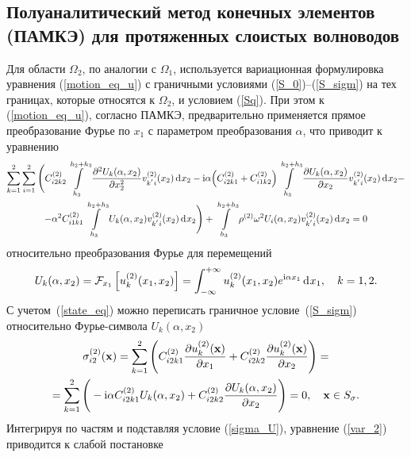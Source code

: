 \documentclass[press]{vestnik}
\begin{document}
	\subsection{Полуаналитический метод конечных элементов (ПАМКЭ) для протяженных слоистых волноводов} \label{SAFE}
Для области $\Omega_{2}$, по аналогии с $\Omega_{1}$, используется вариационная формулировка уравнения (\ref{motion_eq_u}) с граничными условиями (\ref{S_0})–(\ref{S_sigm}) на тех границах, которые относятся к $\Omega_{2}$, и условием (\ref{Sq}). При этом к (\ref{motion_eq_u}), согласно ПАМКЭ, предварительно применяется прямое преобразование Фурье по $x_{1}$ с параметром преобразования $\alpha$, что приводит к уравнению
\begin{multline}\label{var_2}
	\sum_{k=1}^{2} \sum_{i=1}^{2} 
	\Bigg(
	C_{i2k2}^{(2)} \int\limits_{h_{3}}^{h_{2}+h_{3}} \frac{\partial^{2} U_{k}(\alpha,x_{2}) }{\partial x_{2}^{2} } v_{k^{'}i}^{(2)}(x_{2}) \d x_{2} -
	 {\rm{i}} \alpha \Big( C_{i2k1}^{(2)} +C_{i1k2}^{(2)} \Big) \int\limits_{h_{3}}^{h_{2}+h_{3}} \frac{\partial U_{k}(\alpha,x_{2}) }{\partial x_{2} } v_{k^{'}i}^{(2)}(x_{2}) \d x_{2} -
	\\
	-\alpha^{2} C_{i1k1}^{(2)} \int\limits_{h_{3}}^{h_{2}+h_{3}} U_{k}(\alpha,x_{2}) v_{k^{'}i}^{(2)}(x_{2}) \d x_{2}
	\Bigg)
	+ \int\limits_{h_{3}}^{h_{2}+h_{3}} \rho^{(2)} \omega^{2} U_{i}(\alpha,x_{2}) v_{k^{'}i}^{(2)}(x_{2}) \d x_{2} = 0
\end{multline}
относительно преобразования Фурье для перемещений
$$
U_{k}(\alpha,x_2) = \mathcal{F}_{x_1} \left[  u_{k}^{(2)}(x_1,x_2) \right] = \int_{-\infty}^{+\infty} u_{k}^{(2)}(x_1,x_2) e^{{\rm{i}} \alpha x_1}\d x_1, \quad k=1, 2.
$$
С учетом~(\ref{state_eq}) можно переписать граничное условие~(\ref{S_sigm}) относительно Фурье-символа $U_{k}(\alpha,x_{2})$
\begin{multline} \label{sigma_U}
	\sigma_{i2}^{(2)}(\bm{x})=\sum_{k=1}^{2}    
	\Bigg(
	C_{i2k1}^{(2)} \frac{\partial u_{k}^{(2)}(\bm{x}) }{\partial x_{1} } + C_{i2k2}^{(2)} \frac{\partial u_{k}^{(2)}(\bm{x}) }{\partial x_{2} } 
	\Bigg) = 
	\\
	=\sum_{k=1}^{2}    
	\Bigg(
	- {\rm{i}} \alpha C_{i2k1}^{(2)} U_{k}(\alpha,x_{2}) + C_{i2k2}^{(2)} \frac{\partial U_{k}(\alpha,x_{2}) }{\partial x_{2} } 
	\Bigg) = 0, \quad {\bm{x}} \in S_{\sigma}.
\end{multline}
Интегрируя по частям и подставляя условие (\ref{sigma_U}), уравнение (\ref{var_2}) приводится к слабой постановке
\end{document}
